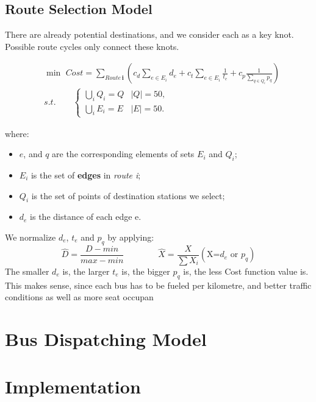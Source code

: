 \documentclass{mcmthesis}
\begin{document}
\subsection{Route Selection Model}
There are already potential destinations, and we consider each as a key knot. Possible route cycles only connect these knots.

\begin{equation}
\begin{aligned}	
    & \min\,\, Cost = \sum\limits_{Route\,\textbf{i}}(c_d \sum\limits_{e\in E_i} d_e + c_t \sum\limits_{e\in E_i} \frac{1}{t_e} + c_p \frac{1}{\sum\limits_{q\in Q_i} p_q})\\
    & s.t. \qquad
    \begin{cases}
    \bigcup\limits_{i}Q_i = Q & |Q| = 50,\\
    \bigcup\limits_{i}E_i = E & |E| = 50.
    \end{cases}
\end{aligned}
\end{equation}

where:
\begin{itemize}
    \item $e$, and $q$ are the corresponding elements of sets $E_i$ and $Q_i$;
    \item $E_i$ is the set of \textbf{edges} in \emph{route i};
    \item $Q_i$ is the set of points of destination stations we select;
    \item $d_e$ is the distance of each edge e.
\end{itemize}

We normalize $d_e$, $t_e$ and $p_q$ by applying:
\begin{equation*}
    \hat{D}=\frac{D - min}{max - min} \qquad \qquad \hat{X}=\frac{X}{\sum X_i}\left(\text{X=$d_e$ or $p_q$}\right)
\end{equation*}
The smaller $d_e$ is, the larger $t_e$ is, the bigger $p_q$ is, the less Cost function value is. This makes sense, since each bus has to be fueled per kilometre, and better traffic conditions as well as more seat occupan

\section{Bus Dispatching Model}



\section{Implementation}
\end{document}

